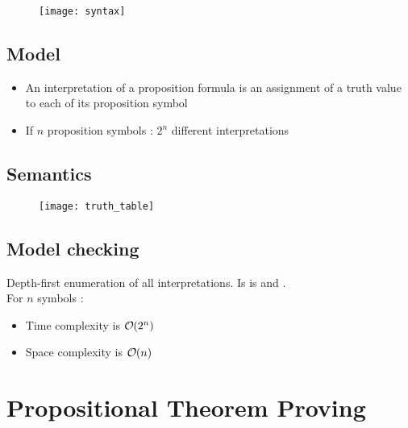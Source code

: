 \begin{figure}[H]
    \centering
    \texttt{[image: syntax]}
\end{figure}

\subsection{Model}

\begin{itemize}
\item An interpretation of a proposition formula is an assignment of a truth value to each of its proposition symbol
\item If $n$ proposition symbols : $2^n$ different interpretations 
\end{itemize}

\subsection{Semantics}

\begin{figure}[H]
    \centering
    \texttt{[image: truth\_table]}
\end{figure}

\subsection{Model checking}

Depth-first enumeration of all interpretations. Is is  and .\\
For $n$ symbols :
\begin{itemize}
\item Time complexity is $\bigO (2^n)$
\item Space complexity is $\bigO (n)$
\end{itemize}

\section{Propositional Theorem Proving}

\lipsum
